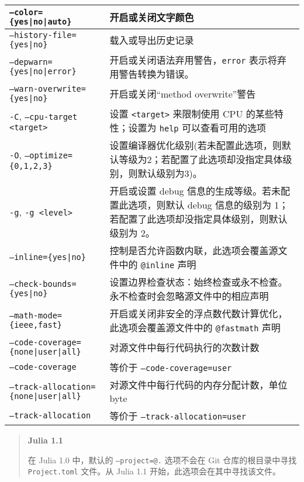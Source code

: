 \begin{table}[h]
\begin{tabulary}{\linewidth}{|L|L|}
\hline
\texttt{--color=\{yes|no|auto\}} & 开启或关闭文字颜色 \\
\hline
\texttt{--history-file=\{yes|no\}} & 载入或导出历史记录 \\
\hline
\texttt{--depwarn=\{yes|no|error\}} & 开启或关闭语法弃用警告，\texttt{error} 表示将弃用警告转换为错误。 \\
\hline
\texttt{--warn-overwrite=\{yes|no\}} & 开启或关闭“method overwrite”警告 \\
\hline
\texttt{-C}, \texttt{--cpu-target <target>} & 设置 \texttt{<target>} 来限制使用 CPU 的某些特性；设置为 \texttt{help} 可以查看可用的选项 \\
\hline
\texttt{-O}, \texttt{--optimize=\{0,1,2,3\}} & 设置编译器优化级别(若未配置此选项，则默认等级为2；若配置了此选项却没指定具体级别，则默认级别为3)。 \\
\hline
\texttt{-g}, \texttt{-g <level>} & 开启或设置 debug 信息的生成等级。若未配置此选项，则默认 debug 信息的级别为 1；若配置了此选项却没指定具体级别，则默认级别为 2。 \\
\hline
\texttt{--inline=\{yes|no\}} & 控制是否允许函数内联，此选项会覆盖源文件中的 \texttt{@inline} 声明 \\
\hline
\texttt{--check-bounds=\{yes|no\}} & 设置边界检查状态：始终检查或永不检查。永不检查时会忽略源文件中的相应声明 \\
\hline
\texttt{--math-mode=\{ieee,fast\}} & 开启或关闭非安全的浮点数代数计算优化，此选项会覆盖源文件中的 \texttt{@fastmath} 声明 \\
\hline
\texttt{--code-coverage=\{none|user|all\}} & 对源文件中每行代码执行的次数计数 \\
\hline
\texttt{--code-coverage} & 等价于 \texttt{--code-coverage=user} \\
\hline
\texttt{--track-allocation=\{none|user|all\}} & 对源文件中每行代码的内存分配计数，单位 byte \\
\hline
\texttt{--track-allocation} & 等价于 \texttt{--track-allocation=user} \\
\hline
\end{tabulary}

\end{table}



\begin{quote}
\textbf{Julia 1.1}

在 Julia 1.0 中，默认的 \texttt{--project=@.} 选项不会在 Git 仓库的根目录中寻找 \texttt{Project.toml} 文件。从 Julia 1.1 开始，此选项会在其中寻找该文件。

\end{quote}


